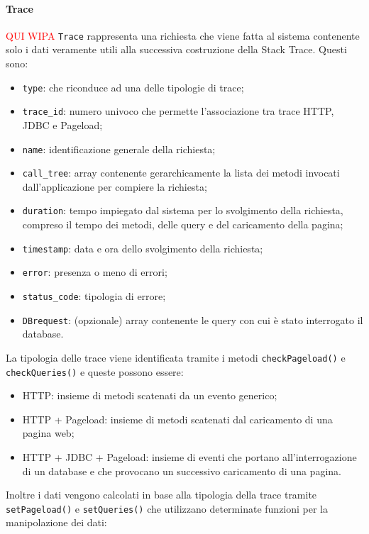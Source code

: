 	\paragraph{Trace}
\label{sec:Trace}
\textcolor{red}{QUI WIPA}
\texttt{Trace} rappresenta una richiesta che viene fatta al sistema contenente solo i dati veramente utili alla successiva costruzione della Stack Trace. Questi sono:
\begin{itemize}
	\item \texttt{type}: che riconduce ad una delle tipologie di trace;
	\item \texttt{trace\_id}: numero univoco che permette l'associazione tra trace HTTP, JDBC e Pageload;
	\item \texttt{name}: identificazione generale della richiesta;
	\item \texttt{call\_tree}: array contenente gerarchicamente la lista dei metodi invocati dall'applicazione per compiere la richiesta;
	\item \texttt{duration}: tempo impiegato dal sistema per lo svolgimento della richiesta, compreso il tempo dei metodi, delle query e del caricamento della pagina;
	\item \texttt{timestamp}: data e ora dello svolgimento della richiesta;
	\item \texttt{error}: presenza o meno di errori;
	\item \texttt{status\_code}: tipologia di errore;
	\item \texttt{DBrequest}: (opzionale) array contenente le query con cui è stato interrogato il database.
\end{itemize}
 La tipologia delle trace viene identificata tramite i metodi \texttt{checkPageload()} e \texttt{checkQueries()} e queste possono essere:
	\begin{itemize}
	\item HTTP: insieme di metodi scatenati da un evento generico;
	\item HTTP + Pageload: insieme di metodi scatenati dal caricamento di una pagina web;
	\item HTTP + JDBC + Pageload: insieme di eventi che portano all'interrogazione di un database e che provocano un successivo caricamento di una pagina.
	\end{itemize}
Inoltre i dati vengono calcolati in base alla tipologia della trace tramite  \texttt{setPageload()} e  \texttt{setQueries()} che utilizzano determinate funzioni per la manipolazione dei dati:
